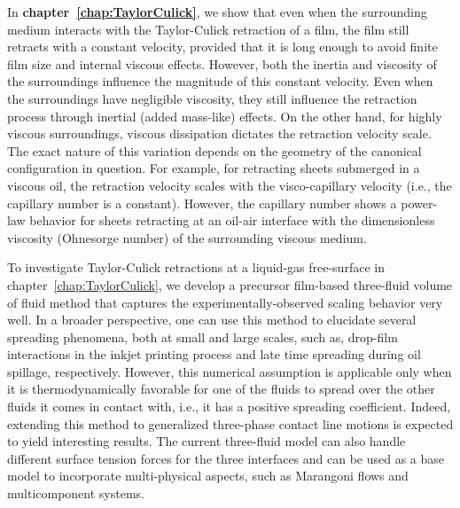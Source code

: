 In \textbf{chapter~\ref{chap:TaylorCulick}}, we show that even when the surrounding medium interacts with the Taylor-Culick retraction of a film, the film still retracts with a constant velocity, provided that it is long enough to avoid finite film size and internal viscous effects. However, both the inertia and viscosity of the surroundings influence the magnitude of this constant velocity. Even when the surroundings have negligible viscosity, they still influence the retraction process through inertial (added mass-like) effects. On the other hand, for highly viscous surroundings, viscous dissipation dictates the retraction velocity scale. The exact nature of this variation depends on the geometry of the canonical configuration in question. For example, for retracting sheets submerged in a viscous oil, the retraction velocity scales with the visco-capillary velocity (i.e., the capillary number is a constant). However, the capillary number shows a power-law behavior for sheets retracting at an oil-air interface with the dimensionless viscosity (Ohnesorge number) of the surrounding viscous medium. 

To investigate Taylor-Culick retractions at a liquid-gas free-surface in chapter~\ref{chap:TaylorCulick}, we develop a precursor film-based three-fluid volume of fluid method that captures the experimentally-observed scaling behavior very well. In a broader perspective, one can use this method to elucidate several spreading phenomena, both at small and large scales, such as, drop-film interactions in the inkjet printing process and late time spreading during oil spillage, respectively. However, this numerical assumption is applicable only when it is thermodynamically favorable for one of the fluids to spread over the other fluids it comes in contact with, i.e., it has a positive spreading coefficient. Indeed, extending this method to generalized three-phase contact line motions is expected to yield interesting results. The current three-fluid model can also handle different surface tension forces for the three interfaces and can be used as a base model to incorporate multi-physical aspects, such as Marangoni flows and multicomponent systems.


